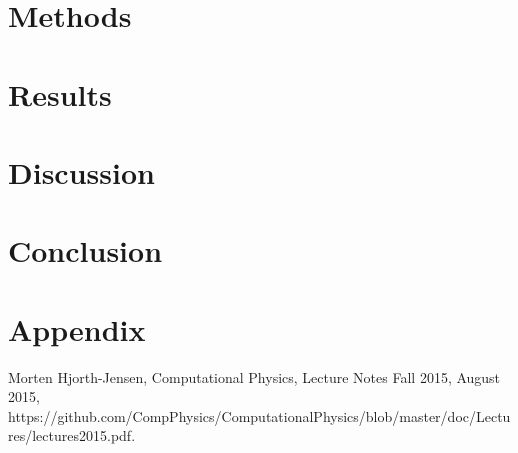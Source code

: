 \documentclass[12pt]{extarticle}
\begin{document}
\section{Methods}
\section{Results}

\section{Discussion}
\section{Conclusion}
\appendix
\section{Appendix}
\begin{thebibliography}{}
	 Morten Hjorth-Jensen, Computational Physics, Lecture Notes Fall 2015, August 2015, https://github.com/CompPhysics/ComputationalPhysics/blob/master/doc/Lectures/lectures2015.pdf.
\end{thebibliography}
\end{document}
